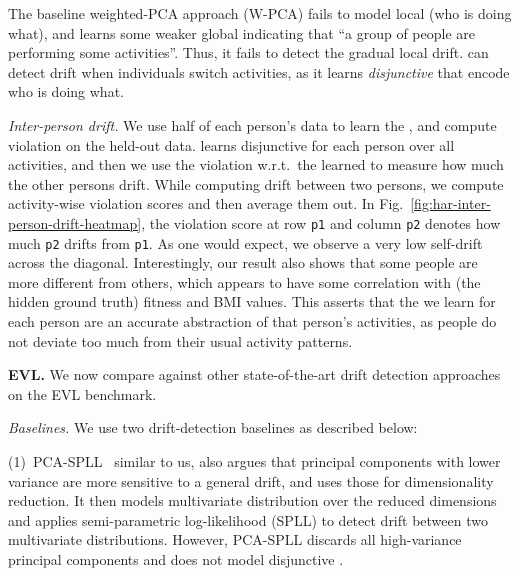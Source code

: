 The baseline weighted-PCA approach (W-PCA) fails to model local \invariants
(who is doing what), and learns some weaker global \invariants indicating that
``a group of people are performing some activities''. Thus, it fails to detect
the gradual local drift. \system can detect drift when individuals switch
activities, as it learns \emph{disjunctive} \invariants that encode who is
doing what.

\smallskip


\noindent {} \emph{Inter-person drift.}  We use half of each person's data to
learn the \invariants, and compute violation on the held-out data. \system
learns disjunctive \invariants for each person over all activities, and then we
use the violation w.r.t.\ the learned \invariants to measure how much the other
persons drift. While computing drift between two persons, we compute
activity-wise \invariant violation scores and then average them out. In
Fig.~\ref{fig:har-inter-person-drift-heatmap}, the violation score at row
\texttt{p1} and column \texttt{p2} denotes how much \texttt{p2} drifts from
\texttt{p1}. As one would expect, we observe a very low self-drift across the
diagonal. Interestingly, our result also shows that some people are more
different from others, which appears to have some correlation with (the hidden
ground truth) fitness and BMI values. This asserts that the \invariants we
learn for each person are an accurate abstraction of that person's activities,
as people do not deviate too much from their usual activity patterns.




\smallskip

\noindent \textbf{EVL.} We now compare \system against other state-of-the-art
drift detection approaches on the EVL benchmark.

\smallskip

\noindent\emph{Baselines.}
%
We use two drift-detection baselines as described below:

\smallskip

(1)~PCA-SPLL~\cite{DBLP:journals/tnn/KunchevaF14} 
similar to us, also argues that principal components with lower variance are
more sensitive to a general drift, and uses those for dimensionality reduction.
It then models multivariate distribution over the reduced dimensions and
applies semi-parametric log-likelihood (SPLL) to detect drift between two
multivariate distributions. However, PCA-SPLL discards all high-variance
principal components and does not model disjunctive \invariants.

